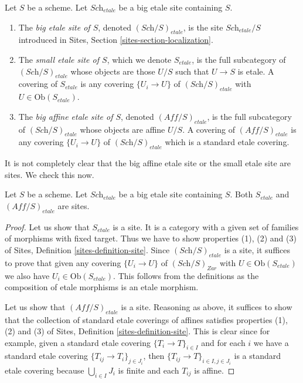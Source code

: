 \begin{definition}
\label{definition-big-small-etale}
Let $S$ be a scheme. Let $\textit{Sch}_{etale}$ be a big etale
site containing $S$.
\begin{enumerate}
\item The {\it big etale site of $S$}, denoted
$(\textit{Sch}/S)_{etale}$, is the site $\textit{Sch}_{etale}/S$
introduced in Sites, Section \ref{sites-section-localization}.
\item The {\it small etale site of $S$}, which we denote
$S_{etale}$, is the full subcategory of $(\textit{Sch}/S)_{etale}$
whose objects are those $U/S$ such that $U \to S$ is etale.
A covering of $S_{etale}$ is any covering $\{U_i \to U\}$ of
$(\textit{Sch}/S)_{etale}$ with $U \in \text{Ob}(S_{etale})$.
\item The {\it big affine etale site of $S$}, denoted
$(\textit{Aff}/S)_{etale}$, is the full subcategory of
$(\textit{Sch}/S)_{etale}$ whose objects are affine $U/S$.
A covering of $(\textit{Aff}/S)_{etale}$ is any covering
$\{U_i \to U\}$ of $(\textit{Sch}/S)_{etale}$ which is a
standard etale covering.
\end{enumerate}
\end{definition}

\noindent
It is not completely clear that
the big affine etale site or the small etale site are sites.
We check this now.

\begin{lemma}
\label{lemma-verify-site-etale}
Let $S$ be a scheme. Let $\textit{Sch}_{etale}$ be a big etale
site containing $S$.
Both $S_{etale}$ and $(\textit{Aff}/S)_{etale}$ are sites.
\end{lemma}

\begin{proof}
Let us show that $S_{etale}$ is a site. It is a category with a
given set of families of morphisms with fixed target. Thus we
have to show properties (1), (2) and (3) of
Sites, Definition \ref{sites-definition-site}.
Since $(\textit{Sch}/S)_{etale}$ is a site, it suffices to prove
that given any covering $\{U_i \to U\}$ of $(\textit{Sch}/S)_{Zar}$
with $U \in \text{Ob}(S_{etale})$ we also have $U_i \in \text{Ob}(S_{etale})$.
This follows from the definitions as the composition of etale morphisms
is an etale morphism.

\medskip\noindent
Let us show that $(\textit{Aff}/S)_{etale}$ is a site.
Reasoning as above, it suffices to show that the collection
of standard etale coverings of affines satisfies properties
(1), (2) and (3) of
Sites, Definition \ref{sites-definition-site}.
This is clear since for example, given a standard etale
covering $\{T_i \to T\}_{i\in I}$ and for each
$i$ we have a standard etale covering $\{T_{ij} \to T_i\}_{j\in J_i}$, then
$\{T_{ij} \to T\}_{i \in I, j\in J_i}$ is a standard etale covering
because $\bigcup_{i\in I} J_i$ is finite and each $T_{ij}$ is affine.
\end{proof}


